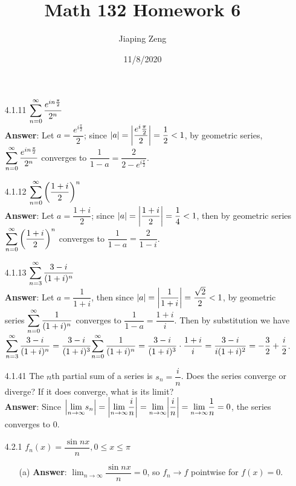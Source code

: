 \documentclass{article}
\title{Math 132 Homework 6}
\date{11/8/2020}
\author{Jiaping Zeng}
\begin{document}
\maketitle

\begin{itemize}
      \item [4.1.11] $\mathlarger{\sum_{n=0}^\infty\frac{e^{in\frac{\pi}{2}}}{2^n}}$\\
            \textbf{Answer}: Let $a=\dfrac{e^{i\frac{\pi}{2}}}{2}$; since $\abs{a}=\abs{\dfrac{e^i\frac{\pi}{2}}{2}}=\dfrac{1}{2}<1$, by geometric series, $\mathlarger{\sum_{n=0}^\infty\frac{e^{in\frac{\pi}{2}}}{2^n}}$ converges to $\dfrac{1}{1-a}=\dfrac{2}{2-e^{i\frac{\pi}{2}}}$.
      \item [4.1.12] $\mathlarger{\sum_{n=0}^\infty\left(\frac{1+i}{2}\right)^n}$\\
            \textbf{Answer}: Let $a=\dfrac{1+i}{2}$; since $\abs{a}=\abs{\dfrac{1+i}{2}}=\dfrac{1}{4}<1$, then by geometric series $\mathlarger{\sum_{n=0}^\infty\left(\frac{1+i}{2}\right)^n}$ converges to $\dfrac{1}{1-a}=\dfrac{2}{1-i}$.
      \item [4.1.13] $\mathlarger{\sum_{n=3}^\infty\frac{3-i}{(1+i)^n}}$\\
            \textbf{Answer}: Let $a=\dfrac{1}{1+i}$, then since $\abs{a}=\abs{\dfrac{1}{1+i}}=\dfrac{\sqrt{2}}{2}<1$, by geometric series $\mathlarger{\sum_{n=0}^\infty\frac{1}{(1+i)^n}}$ converges to $\dfrac{1}{1-a}=\dfrac{1+i}{i}$. Then by substitution we have $\mathlarger{\sum_{n=3}^\infty\frac{3-i}{(1+i)^n}}=\dfrac{3-i}{(1+i)^3}\mathlarger{\sum_{n=0}^\infty\frac{1}{(1+i)^n}}=\dfrac{3-i}{(1+i)^3}\cdot\dfrac{1+i}{i}=\dfrac{3-i}{i(1+i)^2}=-\dfrac{3}{2}+\dfrac{i}{2}$.
      \item [4.1.41] The $n$th partial sum of a series is $s_n=\dfrac{i}{n}$. Does the series converge or diverge? If it does converge, what is its limit?\\
            \textbf{Answer}: Since $\abs{\mathlarger{\lim_{n\rightarrow\infty}}s_n}=\abs{\mathlarger{\lim_{n\rightarrow\infty}}\dfrac{i}{n}}=\mathlarger{\lim_{n\rightarrow\infty}}\abs{\dfrac{i}{n}}=\mathlarger{\lim_{n\rightarrow\infty}}\dfrac{1}{n}=0$, the series converges to $0$.
      \item [4.2.1] $f_n(x)=\dfrac{\sin nx}{n},0\leq x\leq\pi$
            \begin{itemize}
                  \item [(a)] \textbf{Answer}: $\lim_{n\rightarrow\infty}\dfrac{\sin nx}{n}=0$, so $f_n\rightarrow f$ pointwise for $f(x)=0$.

\end{itemize}
\end{itemize}
\end{document}
